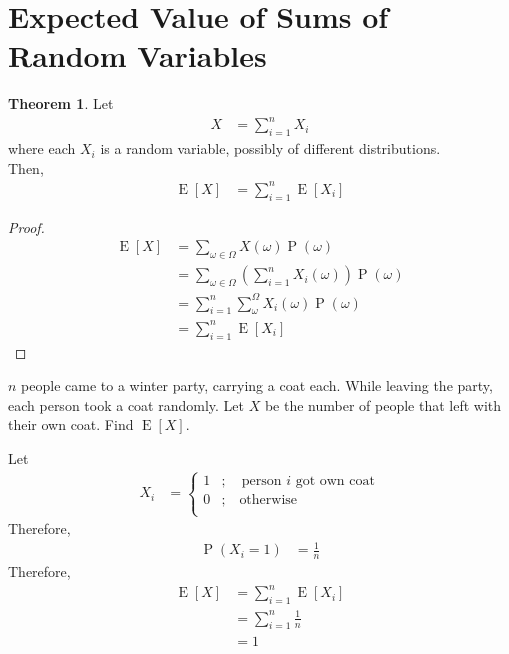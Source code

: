 \documentclass[titlepage, fleqn, a4paper, 12pt, twoside]{article}
\theoremstyle{definition}
\theoremstyle{theorem}
\newtheorem{theorem}{Theorem}
\DeclareMathOperator{\prob}{\mathrm{P}}
\DeclareMathOperator{\expct}{\mathrm{E}}
\begin{document}
\section{Expected Value of Sums of Random Variables}

\begin{theorem}
	Let
	\begin{align*}
		X & = \sum\limits_{i = 1}^{n} X_i
	\end{align*}
	where each $X_i$ is a random variable, possibly of different distributions.\\
	Then,
	\begin{align*}
		\expct[X] & = \sum\limits_{i = 1}^{n} \expct[X_i]
	\end{align*}
\end{theorem}

\begin{proof}
	\begin{align*}
		\expct[X] & = \sum\limits_{\omega \in \Omega} X(\omega) \prob(\omega)                                          \\
                          & = \sum\limits_{\omega \in \Omega} \left( \sum\limits_{i = 1}^{n} X_i(\omega) \right) \prob(\omega) \\
                          & = \sum\limits_{i = 1}^{n} \sum\limits_{\omega}^{\Omega} X_i(\omega) \prob(\omega)                  \\
                          & = \sum\limits_{i = 1}^{n} \expct[X_i]
	\end{align*}
\end{proof}

\begin{question}
	$n$ people came to a winter party, carrying a coat each.
	While leaving the party, each person took a coat randomly.
	Let $X$ be the number of people that left with their own coat.
	Find $\expct[X]$.
\end{question}

\begin{solution}
	Let
	\begin{align*}
		X_i &=
			\begin{cases}
				1 & ;\quad \text{person $i$ got own coat} \\
				0 & ;\quad \text{otherwise}               \\
			\end{cases}
	\end{align*}
	Therefore,
	\begin{align*}
		\prob(X_i = 1) & = \frac{1}{n}
	\end{align*}
	Therefore,
	\begin{align*}
		\expct[X] & = \sum\limits_{i = 1}^{n} \expct[X_i] \\
                          & = \sum\limits_{i = 1}^{n} \frac{1}{n} \\
                          & = 1
	\end{align*}
\end{solution}
\end{document}
